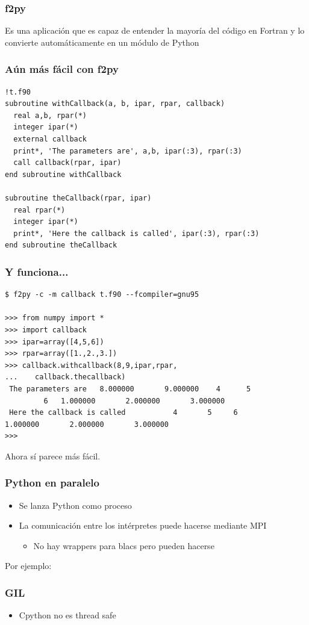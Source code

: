 \documentclass{beamer}
\begin{document}
\begin{frame}
 \frametitle{f2py}
Es una aplicación que es capaz de entender la mayoría del código en Fortran y lo convierte automáticamente en un módulo de Python
\end{frame}


\begin{frame}[containsverbatim]
 \frametitle{Aún más fácil con f2py}
\begin{verbatim}
!t.f90
subroutine withCallback(a, b, ipar, rpar, callback)
  real a,b, rpar(*)
  integer ipar(*)
  external callback
  print*, 'The parameters are', a,b, ipar(:3), rpar(:3)
  call callback(rpar, ipar)
end subroutine withCallback

subroutine theCallback(rpar, ipar)
  real rpar(*)
  integer ipar(*)
  print*, 'Here the callback is called', ipar(:3), rpar(:3)
end subroutine theCallback
\end{verbatim}
\end{frame}

\begin{frame}[containsverbatim]
 \frametitle{Y funciona...}
\begin{verbatim}
$ f2py -c -m callback t.f90 --fcompiler=gnu95

>>> from numpy import *
>>> import callback
>>> ipar=array([4,5,6])
>>> rpar=array([1.,2.,3.])
>>> callback.withcallback(8,9,ipar,rpar,
...    callback.thecallback)
 The parameters are   8.000000       9.000000    4      5 
         6   1.000000       2.000000       3.000000
 Here the callback is called           4       5     6  
1.000000       2.000000       3.000000
>>>
\end{verbatim}
\end{frame}

\begin{frame}
 \begin{center}
 \begin{huge}
  Ahora sí parece más fácil.
 \end{huge}
\end{center}
\end{frame}

\begin{frame}
 \frametitle{Python en paralelo}
\begin{itemize}
 \item Se lanza Python como proceso
 \item La comunicación entre los intérpretes puede hacerse mediante MPI
 \begin{itemize}
  \item No hay wrappers para blacs pero pueden hacerse
 \end{itemize}
\end{itemize}
Por ejemplo:
\end{frame}

\begin{frame}
 \frametitle{GIL}
\begin{itemize}
 \item Cpython no es thread safe
\end{itemize}

\end{frame}
\end{document}

